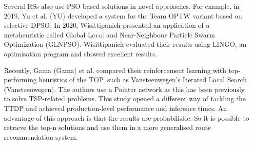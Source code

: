 Several RSs also use PSO-based solutions in novel approaches. For example, in
2019, Yu et al. (YU) developed a system for the Team OPTW variant based on
selective DPSO. In 2020, Wisittipanich presented an application of a
metaheuristic called Global Local and Near-Neighbour Particle Swarm
Optimization (GLNPSO). Wisittipanich evaluated their results using LINGO, an
optimisation program and showed excellent results.

Recently, Gama (Gama) et al. compared their reinforcement learning with
top-performing heuristics of the TOP, such as Vansteenwegen's Iterated Local
Search (Vansteenwegen). The authors use a Pointer network as this has been
previously to solve TSP-related problems. This study opened a different way of
tackling the TTDP and achieved production-level performance and inference
times. An advantage of this approach is that the results are probabilistic. So
it is possible to retrieve the top-n solutions and use them in a more
generalised route recommendation system.

